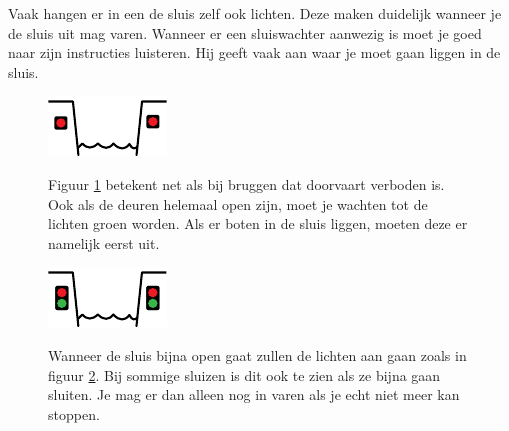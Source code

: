 Vaak hangen er in een de sluis zelf ook lichten. Deze maken duidelijk wanneer je de sluis uit mag varen. Wanneer er een sluiswachter aanwezig is moet je goed naar zijn instructies luisteren. Hij geeft vaak aan waar je moet gaan liggen in de sluis. 

\hfill
\begin{figure}[H]
	\centering
	\begin{minipage}[b]{0.18\textwidth}
		\includegraphics[width=\textwidth]{Hoofdstukken/Bruggen/pdf/sluis_verboden.pdf}
		\caption{}
		\label{pic:sluis:verbod}
	\end{minipage}
	\hfill
	\begin{minipage}[t]{0.75\textwidth}
		\vspace{-2cm}
		Figuur \ref{pic:sluis:verbod} betekent net als bij bruggen dat doorvaart verboden is. Ook als de deuren helemaal open zijn, moet je wachten tot de lichten groen worden. Als er boten in de sluis liggen, moeten deze er namelijk eerst uit.
	\end{minipage}
\end{figure}
\vspace{-0.35cm}
\begin{figure}[H]
	\centering
	\begin{minipage}[b]{0.18\textwidth}	
		\includegraphics[width=\textwidth]{Hoofdstukken/Bruggen/pdf/sluis_aanstonds.pdf}
		\caption{}
		\label{pic:sluis:aanstonds}
	\end{minipage}
	\hfill
	\begin{minipage}[t]{0.75\textwidth}
		\vspace{-2cm}
		Wanneer de sluis bijna open gaat zullen de lichten aan gaan zoals in figuur \ref{pic:sluis:aanstonds}. Bij sommige sluizen is dit ook te zien als ze bijna gaan sluiten. Je mag er dan alleen nog in varen als je echt niet meer kan stoppen.
	\end{minipage}
\end{figure}

